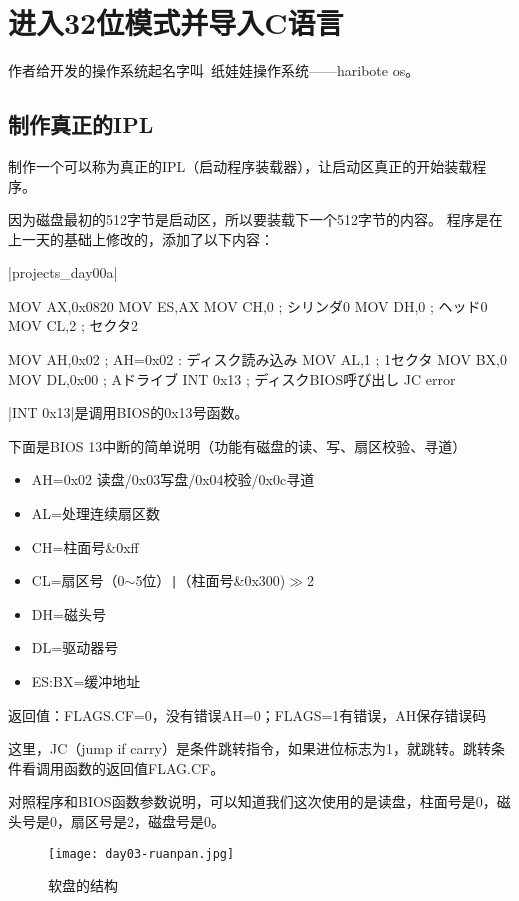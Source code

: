 ﻿\chapter{	进入32位模式并导入C语言	}
作者给开发的操作系统起名字叫~纸娃娃操作系统——haribote os。
\section{	制作真正的IPL	}
制作一个可以称为真正的IPL（启动程序装载器），让启动区真正的开始装载程序。

\cs

因为磁盘最初的512字节是启动区，所以要装载下一个512字节的内容。
程序是在上一天的基础上修改的，添加了以下内容：

\dag |projects_day\harib00a|
\begin{code}[label=ipl.nas 本次添加的部分]
        MOV		AX,0x0820
		MOV		ES,AX
		MOV		CH,0			; シリンダ0
		MOV		DH,0			; ヘッド0
		MOV		CL,2			; セクタ2

		MOV		AH,0x02			; AH=0x02 : ディスク読み込み
		MOV		AL,1			; 1セクタ
		MOV		BX,0
		MOV		DL,0x00			; Aドライブ
		INT		0x13			; ディスクBIOS呼び出し
		JC		error
\end{code}

|INT 0x13|是调用BIOS的0x13号函数。

下面是BIOS 13中断的简单说明（功能有磁盘的读、写、扇区校验、寻道）
\begin{itemize}
  \item AH=0x02 读盘/0x03写盘/0x04校验/0x0c寻道
  \item AL=处理连续扇区数
  \item CH=柱面号\&0xff
  \item CL=扇区号（0$\sim$5位）\verb`|`（柱面号\&0x300)$\gg$2
  \item DH=磁头号
  \item DL=驱动器号
  \item ES:BX=缓冲地址
\end{itemize}

返回值：FLAGS.CF=0，没有错误AH=0；FLAGS=1有错误，AH保存错误码

这里，JC（jump if carry）是条件跳转指令，如果进位标志为1，就跳转。跳转条件看调用函数的返回值FLAG.CF。

对照程序和BIOS函数参数说明，可以知道我们这次使用的是读盘，柱面号是0，磁头号是0，扇区号是2，磁盘号是0。
\cs

\begin{figure}[!ht]
  \centering
  \texttt{[image: day03-ruanpan.jpg]}\\
  \caption{软盘的结构}\label{ruanpan}
\end{figure}

